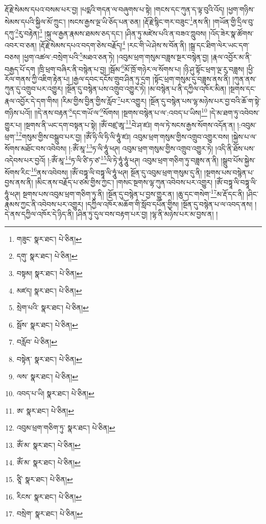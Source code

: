 རྡོ་རྗེ་སེམས་དཔའ་བསམ་པར་བྱ། །པདྨའི་གདན་ལ་བཞུགས་པ་སྟེ། །གངས་དང་ཀུན་ད་ལྟ་བུའི་འོད། །ཕྱག་གཉིས་སེམས་དཔའི་སྐྱིལ་མོ་ཀྲུང་། །སངས་རྒྱས་ལྔ་ཡི་ཅོད་པན་ཅན། །རྡོ་རྗེ་སྙིང་གར་བཟུང་\footnote{གཟུང་  སྣར་ཐང་།  པེ་ཅིན། }ནས་ནི། །གཡོན་གྱི་དྲིལ་བུ་དཀུ་\footnote{དགུ་  སྣར་ཐང་།  པེ་ཅིན། }རུ་བརྟེན།\footnote{བསྟམ།  སྣར་ཐང་།  པེ་ཅིན། } །སྐུ་ལ་རྒྱན་རྣམས་ཐམས་ཅད་དང་། །ཤིན་ཏུ་མཛེས་པའི་ན་བཟའ་ཀླུབས། །འོད་ཟེར་སྣ་ཚོགས་འབར་བ་ཅན། །རྡོ་རྗེ་སེམས་དཔའ་བདག་ཅེས་བརྗོད།\footnote{མཛད།  སྣར་ཐང་།  པེ་ཅིན། } །རང་གི་ཡེ་ཤེས་ས་བོན་ནི། །སྒྲ་དང་ཐིག་ལེར་ཡང་དག་བཅས། །ཕྱག་འཚལ་:བསྲེག་པའི་\footnote{སྲེག་པའི་  སྣར་ཐང་།  པེ་ཅིན། }མཐའ་ཅན་ཏེ། །འབུམ་ཕྲག་གསུམ་བཟླས་སྔར་བསྙེན་བྱ། །རྣལ་འབྱོར་མ་ནི་བརྒྱད་པོ་དག །ཁྲི་ཕྲག་བཞིར་ནི་བསྙེན་པ་བྱ། །སྦོམ་\footnote{སྦོས་  སྣར་ཐང་།  པེ་ཅིན། }མོ་ཁྲོ་གཉེར་ལ་སོགས་པ། །ཉི་ཤུ་སྟོང་ཕྲག་ལྔ་རུ་བཟླས། །ཕྱི་རོལ་གནས་ཀྱི་འཇིག་རྟེན་པ། །རྒྱལ་དབང་དངོས་གྲུབ་ཤིན་ཏུ་དྲག །སྟོང་ཕྲག་གསུམ་དུ་བཟླས་ནས་ནི། །ཀུན་ནས་ཀུན་དུ་འགྲུབ་པར་འགྱུར། །སྔོན་དུ་བསྙེན་པས་འགྲུབ་འགྱུར་ཏེ། །མ་བསྙེན་པ་ནི་དཀྱིལ་འཁོར་མིན། །སྔགས་དང་རྣལ་འབྱོར་དེ་དག་གིས། །རིམ་གྱིས་བྱིན་གྱིས་རློབ་\footnote{བརློབ་  པེ་ཅིན། }པར་འགྱུར། །སྔོན་དུ་བསྙེན་པས་ལྷ་མཉེས་པར་བྱ་བའི་ཆོ་ག་སྟེ་གཉིས་པའོ།། །།དེ་ནས་བརྟན་\footnote{བསྟེན་  སྣར་ཐང་།  པེ་ཅིན། }དང་གཡོ་ལ་\footnote{ལས་  སྣར་ཐང་།  པེ་ཅིན། }སོགས། །སྔགས་བསྙེན་པ་ལ་:འབད་པ་ཡིས།\footnote{འབད་པ་ཡི།  སྣར་ཐང་།  པེ་ཅིན། } །དེ་མ་ཐག་ཏུ་འབེབས་གྱུར་པ། །སྔགས་ནི་ཡང་དག་བསྟན་པ་སྟེ། །ཨོཾ་བཛྲ་ཨཱ་\footnote{ཨ་  སྣར་ཐང་།  པེ་ཅིན། }བེ་ཤ་ཛཿ། གལ་ཏེ་སངས་རྒྱས་སོགས་འདོན་ན། །:འབུམ་ཕྲག་\footnote{འབུམ་ཕྲག་གཅིག་ཏུ་  སྣར་ཐང་།  པེ་ཅིན། }གསུམ་གྱིས་བསྒྲུབ་པར་བྱ། །ཨོཾ་ཧི་ལི་ཧི་ལི་ཧཱུཾ་ཛཿ། འབུམ་ཕྲག་གསུམ་གྱིས་འགྲུབ་འགྱུར་བས། །སྐྱེས་པ་ལ་སོགས་མཐོང་བས་འབེབས། །:ཨོཾ་མཱ་\footnote{ཨོཾ་མ་  སྣར་ཐང་།  པེ་ཅིན། }ཏ་ལི་ཧཱུཾ་ཕཊ། འབུམ་ཕྲག་གསུམ་གྱིས་འགྲུབ་འགྱུར་ཏེ། །འདི་ནི་ཐོས་པས་འདེབས་པར་བྱའོ། །:ཨོཾ་མཱ་\footnote{ཨོཾ་མ་  སྣར་ཐང་།  པེ་ཅིན། }ཏ་ལི་ཙི་ཏ་ཙ་\footnote{ཙཱི་  སྣར་ཐང་།  པེ་ཅིན། }ལི་ཏེ་ཧཱུཾ་ཧཱུཾ་ཕཊ། འབུམ་ཕྲག་གཅིག་ཏུ་བཟླས་ན་ནི། །སྒྲུབ་པོས་སྐྱེས་སོགས་རིང་\footnote{རིངས་  སྣར་ཐང་།  པེ་ཅིན། }ནས་འབེབས། །ཨོཾ་བཏྟཱ་ལི་བཏྟཱ་ལི་ཧཱུཾ་ཕཊ། སྔོན་དུ་འབུམ་ཕྲག་གསུམ་དུ་ནི། །སྔགས་པས་བསྙེན་པ་བྱས་ནས་ནི། །མིང་ནས་བརྗོད་པ་ཙམ་གྱིས་ཀྱང་། །གསང་སྔགས་ལྷ་ཀུན་འབེབས་པར་འགྱུར། །ཨོཾ་བཏྟཱ་ལི་བཏྟཱ་ལི་ཧཱུཾ་ཕཊ། སྔགས་པས་འབུམ་ཕྲག་གཅིག་ཏུ་ནི། །སྔོན་དུ་བསྙེན་པ་བྱས་གྱུར་ན། །ཆུ་དང་གསེག་\footnote{བསྲེག་  སྣར་ཐང་།  པེ་ཅིན། }མ་རྡོ་དང་ནི། །ཤིང་རྣམས་ཀྱང་ནི་འབེབས་པར་འགྱུར། །དཀྱིལ་འཁོར་མཆོག་གི་སློབ་དཔོན་གྱིས། །སྔོན་དུ་བསྙེན་པ་ལ་འབད་ནས། །དེ་ནས་དཀྱིལ་འཁོར་དེ་ཉིད་ནི། །ཤིན་ཏུ་དུལ་བས་བརྟག་པར་བྱ། །ལྷ་ནི་མཉེས་པར་མ་བྱས་ན། །
